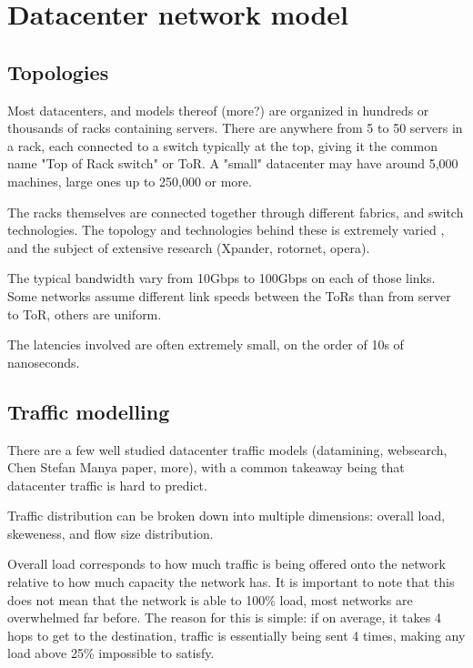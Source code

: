 \chapter{Datacenter network model} \label{model}

\section{Topologies} \label{model-topology}

Most datacenters, and models thereof \cite{mellette_rotornet_2017}\cite{handley_re-architecting_2017}\cite{mellette_expanding_2019} (more?) are organized in hundreds or thousands of racks containing servers.
There are anywhere from 5 to 50 servers in a rack, each connected to a switch typically at the top, giving it the common name "Top of Rack switch" or ToR.
A "small" datacenter may have around 5,000 machines, large ones up to 250,000 or more. %

The racks themselves are connected together through different fabrics, and switch technologies.
The topology and technologies behind these is extremely varied \cite{kassing_beyond_2017}, and the subject of extensive research (Xpander, rotornet, opera).

The typical bandwidth vary from 10Gbps to 100Gbps on each of those links.
Some networks assume different link speeds between the ToRs than from server to ToR, others are uniform.

The latencies involved are often extremely small, on the order of 10s of nanoseconds.


\section{Traffic modelling} \label{model-traffic}

There are a few well studied datacenter traffic models (datamining, websearch, Chen Stefan Manya paper, more), with a common takeaway being that datacenter traffic is hard to predict.

Traffic distribution can be broken down into multiple dimensions: overall load, skeweness, and flow size distribution.

Overall load corresponds to how much traffic is being offered onto the network relative to how much capacity the network has.
It is important to note that this does not mean that the network is able to 100\% load, most networks are overwhelmed far before.
The reason for this is simple: if on average, it takes 4 hops to get to the destination, traffic is essentially being sent 4 times, making any load above 25\% impossible to satisfy.

